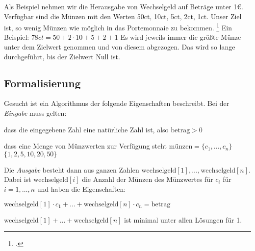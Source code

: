 \documentclass{lehramt-informatik-aufgabe}
\begin{document}

Als Beispiel nehmen wir die Herausgabe von Wechselgeld auf Beträge unter
1€. Verfügbar sind die Münzen mit den Werten 50ct, 10ct, 5ct, 2ct, 1ct.
Unser Ziel ist, so wenig Münzen wie möglich in das Portemonnaie zu
bekommen.
\footcite{net:html:wikiversity:wechselgeld}
%
Ein Beispiel: $78ct = 50 + 2 \cdot 10 + 5 + 2 + 1$
%
Es wird jeweils immer die größte Münze unter dem Zielwert genommen und
von diesem abgezogen. Das wird so lange durchgeführt, bis der Zielwert
Null ist.

%

\subsection{Formalisierung}

Gesucht ist ein Algorithmus der folgende Eigenschaften beschreibt.
Bei der \emph{Eingabe} muss gelten:

\bigskip

\begin{compactenum}
\item dass die eingegebene Zahl eine natürliche Zahl ist, also
$\text{betrag} > 0$

\item dass eine Menge von Münzwerten zur Verfügung steht $
\text{münzen}=\{c_1,...,c_n\}$ \zB $\{1,2,5,10,20,50\}$
\end{compactenum}

\bigskip

\noindent
Die \emph{Ausgabe} besteht dann aus ganzen Zahlen
$\text{wechselgeld}[1], \ldots ,\text{wechselgeld}[n]$.
Dabei ist $\text{wechselgeld}[i] $ die Anzahl der Münzen
des Münzwertes für $ c_i $ für $ i=1,\ldots,n $ und haben die
Eigenschaften:

\bigskip

\begin{compactenum}
\item $\text{wechselgeld}[1] \cdot c_1 + \ldots +
\text{wechselgeld}[n] \cdot c_n = \text{betrag}$

\item $\text{wechselgeld}[1] + \ldots + \text{wechselgeld}[n] $
ist minimal unter allen Lösungen für 1.
\end{compactenum}

%

\begin{liAntwort}
\end{liAntwort}
\end{document}
